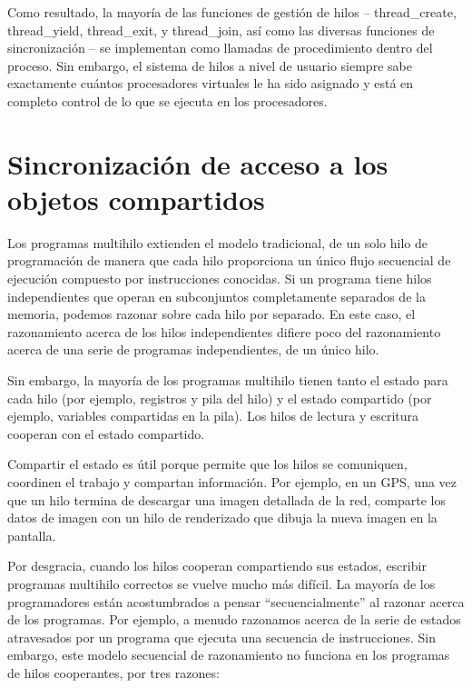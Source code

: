 \documentclass[10pt]{book}
\begin{document}
Como resultado, la mayoría de las funciones de gestión de hilos -- {\mf thread\_create}, {\mf thread\_yield}, {\mf thread\_exit}, y {\mf thread\_join}, así como las diversas funciones de sincronización -- se implementan como llamadas de procedimiento dentro del proceso. Sin embargo, el sistema de hilos a nivel de usuario siempre sabe exactamente cuántos procesadores virtuales le ha sido asignado y está en completo control de lo que se ejecuta en los procesadores.

\chapter{Sincronización de acceso a los objetos compartidos}
Los programas multihilo extienden el modelo tradicional, de un solo hilo de programación de manera que cada hilo proporciona un único flujo secuencial de ejecución compuesto por instrucciones conocidas. Si un programa tiene hilos independientes que operan en subconjuntos completamente separados de la memoria, podemos razonar sobre cada hilo por separado. En este caso, el razonamiento acerca de los hilos independientes difiere poco del razonamiento acerca de una serie de programas independientes, de un único hilo.

Sin embargo, la mayoría de los programas multihilo tienen tanto el estado para cada hilo (por ejemplo, registros y pila del hilo) y el estado compartido (por ejemplo, variables compartidas en la pila). Los hilos de lectura y escritura cooperan con el estado compartido.

Compartir el estado es útil porque permite que los hilos se comuniquen, coordinen el trabajo y compartan información. Por ejemplo, en un GPS, una vez que un hilo termina de descargar una imagen detallada de la red, comparte los datos de imagen con un hilo de renderizado que dibuja la nueva imagen en la pantalla.

Por desgracia, cuando los hilos cooperan compartiendo sus estados, escribir programas multihilo correctos se vuelve mucho más difícil. La mayoría de los programadores están acostumbrados a pensar ``secuencialmente'' al razonar acerca de los programas. Por ejemplo, a menudo razonamos acerca de la serie de estados atravesados por un programa que ejecuta una secuencia de instrucciones. Sin embargo, este modelo secuencial de razonamiento no funciona en los programas de hilos cooperantes, por tres razones:
\end{document}
